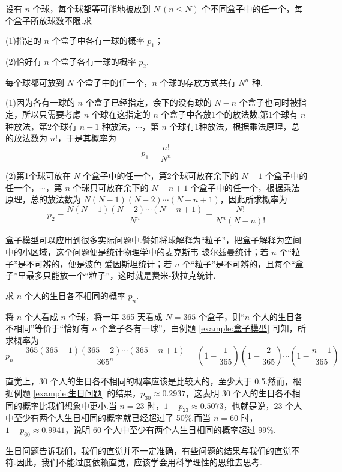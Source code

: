 \begin{example}
    \indent 设有 $n$ 个球，每个球都等可能地被放到 $N \, (n \leqslant N)$ 个不同盒子中的任一个，每个盒子所放球数不限.求

    (1)指定的 $n$ 个盒子中各有一球的概率 $p_1$；

    (2)恰好有 $n$ 个盒子各有一球的概率 $p_2$.
\end{example}

\begin{solution}
    每个球都可放到 $N$ 个盒子中的任一个，$n$ 个球的存放方式共有 $N^n$ 种.

    (1)因为各有一球的 $n$ 个盒子已经指定，余下的没有球的 $N-n$ 个盒子也同时被指定，所以只需要考虑 $n$ 个球在这指定的 $n$ 个盒子中各放1个的放法数.第1个球有 $n$ 种放法，第2个球有 $n-1$ 种放法，$\cdots$，第 $n$ 个球有1种放法，根据乘法原理，总的放法数为 $n!$，于是其概率为
    $$
    p_1 = \dfrac{n!}{N^n}
    $$

    (2)第1个球可放在 $N$ 个盒子中的任一个，第2个球可放在余下的 $N-1$ 个盒子中的任一个，$\cdots$，第 $n$ 个球只可放在余下的 $N-n+1$ 个盒子中的任一个，根据乘法原理，总的放法数为 $N (N-1) (N-2) \cdots (N-n+1)$，因此所求概率为
    $$
    p_2 = \dfrac{N (N-1) (N-2) \cdots (N-n+1)}{N^n} = \dfrac{N!}{N^n (N-n)!}
    $$
\end{solution}

\begin{note}
    \indent 盒子模型可以应用到很多实际问题中.譬如将球解释为“粒子”，把盒子解释为空间中的小区域，这个问题便是统计物理学中的麦克斯韦-玻尔兹曼统计；若 $n$ 个“粒子”是不可辨的，便是波色-爱因斯坦统计；若 $n$ 个“粒子”是不可辨的，且每个“盒子”里最多只能放一个“粒子”，这时就是费米-狄拉克统计.
\end{note}

\begin{example}
    \indent 求 $n$ 个人的生日各不相同的概率 $p_n$.
\end{example}

\begin{solution}
    将 $n$ 个人看成 $n$ 个球，将一年 365 天看成 $N=365$ 个盒子，则“$n$ 个人的生日各不相同”等价于“恰好有 $n$ 个盒子各有一球”，由例题 \ref{example:盒子模型} 可知，所求概率为
    $$
    p_n = \dfrac{365 (365-1) (365-2) \cdots (365-n+1)}{365^n} = \left( 1 - \dfrac{1}{365} \right) \left( 1 - \dfrac{2}{365} \right) \cdots \left( 1 - \dfrac{n-1}{365} \right)
    $$
\end{solution}

\begin{note}
    \indent 直觉上，30 个人的生日各不相同的概率应该是比较大的，至少大于 0.5.然而，根据例题 \ref{example:生日问题} 的结果，$p_{30} \approx 0.2937$，这表明 30 个人的生日各不相同的概率比我们想象中更小.当 $n=23$ 时，$1 - p_{23} \approx 0.5073$，也就是说，23 个人中至少有两个人生日相同的概率就已经超过了 50\%.而当 $n=60$ 时，$1 - p_{60} \approx 0.9941$，说明 60 个人中至少有两个人生日相同的概率超过 99\%.

    生日问题告诉我们，我们的直觉并不一定准确，有些问题的结果与我们的直觉不符.因此，我们不能过度依赖直觉，应该学会用科学理性的思维去思考.
\end{note}

